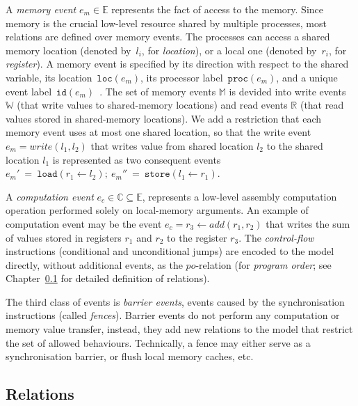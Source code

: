 A \textit{memory event} $e_m \in \mathbb{E}$ represents the fact of access to the memory. Since memory is the crucial low-level resource shared by multiple processes, most relations are defined over memory events. 
The processes can access a shared memory location (denoted by~$l_i$, for \textit{location}), or a local one (denoted by~$r_i$, for \textit{register}). A memory event is specified by its direction with respect to the shared variable, its location~$\texttt{loc}(e_m)$, its processor label~$\texttt{proc}(e_m)$, and a unique event label~$\texttt{id}(e_m)$~\cite{alglave2010shared}. 
The set of memory events $\mathbb{M}$ is devided into write events $\mathbb{W}$ (that write values to shared-memory locations) and read events $\mathbb{R}$ (that read values stored in shared-memory locations).
We add a restriction that each memory event uses at most one shared location, so that the write event $e_m = write(l_1, l_2)$ that writes value from shared location $l_2$ to the shared location $l_1$ is represented as two consequent events $e_m'~=~\texttt{load}(r_1 \leftarrow l_2); \ e_m''~=~\texttt{store}(l_1 \leftarrow r_1)$.

A \textit{computation event} $e_c \in \mathbb{C} \subseteq \mathbb{E}$, represents a low-level assembly computation operation performed solely on local-memory arguments. An example of computation event may be the event $e_c = r_3 \leftarrow add(r_1, r_2)$ that writes the sum of values stored in registers $r_1$ and $r_2$ to the register $r_3$. The \textit{control-flow} instructions (conditional and unconditional jumps) are encoded to the model directly, without additional events, as the $po$-relation (for \textit{program order}; see Chapter~\ref{ch:wmm:model:relations} for detailed definition of relations).

The third class of events is \textit{barrier events}, events caused by the synchronisation instructions (called \textit{fences}). Barrier events do not perform any computation or memory value transfer, instead, they add new relations to the model that restrict the set of allowed behaviours. Technically, a fence may either serve as a synchronisation barrier, or flush local memory caches, etc.


\subsection{Relations}
\label{ch:wmm:model:relations}

